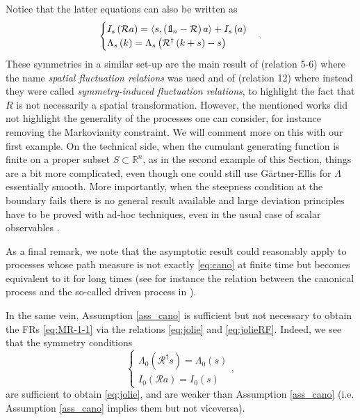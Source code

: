 \documentclass[a4paper,11pt]{article}
\numberwithin{equation}{section}
\newcommand{\bbbone}{\mathchoice {\rm 1\mskip-4mu l} {\rm 1\mskip-4mu l}
{\rm 1\mskip-4.5mu l} {\rm 1\mskip-5mu l}}
\begin{document}
Notice that the latter equations can also be written as 
\begin{equation}\label{eq:MR-1-1}
\begin{cases}
I_s \left(\mathcal{R} a\right)=\left\langle s ,\left(\bbbone_n -\mathcal{R}\right) a \right\rangle +I_s\left(a\right)\\
\Lambda_s\left(k\right) = \Lambda_s \left(\mathcal{R}^{\dagger}\left(k +s\right) -s\right) 
\end{cases}.
\end{equation}
These symmetries in a similar set-up are the main result of \cite{PRG15} (relation 5-6) where the name \emph{spatial fluctuation relations} was used and of \cite{MPG20} (relation 12) where instead they were called \emph{symmetry-induced fluctuation relations}, to highlight the fact that $R$ is not necessarily a spatial transformation. However, the mentioned works did not highlight the generality of the processes one can consider, for instance removing the Markovianity constraint. We will comment more on this with our first example. On the technical side, when the cumulant generating function is finite on a proper subset $S \subset \mathbb{R}^n$, as in the second example of this Section, things are a bit more complicated, even though one could still use G\"artner-Ellis for $\Lambda$ essentially smooth. More importantly, when the steepness condition at the boundary fails there is no general result available and large deviation principles have to be proved with ad-hoc techniques, even in the usual case of scalar observables \cite{JPS17}.

As a final remark, we note that the asymptotic result could reasonably apply to processes whose path measure is not exactly \eqref{eq:cano} at finite time but becomes equivalent to it for long times (see for instance the relation between the canonical process and the so-called driven process in \cite{CT15a}).

In the same vein, Assumption \ref{ass_cano} is sufficient but not necessary to obtain the FRs \eqref{eq:MR-1-1} via the relations \eqref{eq:jolie} and \eqref{eq:jolieRF}. Indeed, we see that the symmetry conditions 
\[
\begin{cases}\label{eq:sym}
\Lambda_{0}\left(\mathcal{R}^\dag s\right)=\Lambda_{0}\left(s\right)\\
I_{0}\left(\mathcal{R}a\right)=I_{0}\left(s\right)
\end{cases}, 
\]
 are sufficient to obtain \eqref{eq:jolie}, and are weaker than  Assumption \ref{ass_cano} (i.e. Assumption \ref{ass_cano} implies them but not viceversa). 
\end{document}
